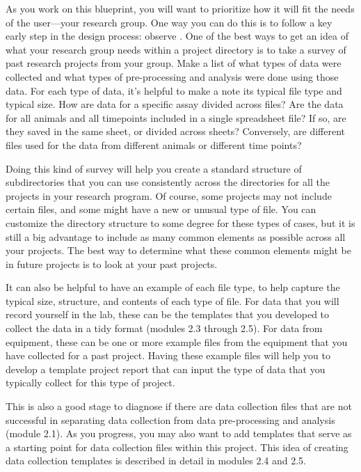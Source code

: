 \documentclass[]{tufte-book}
\begin{document}
As you work on this blueprint, you will want to prioritize how it will fit the
needs of the user---your research group. One way you can do this is to follow a
key early step in the design process: observe \citep{osann2020design}. One of the
best ways to get an idea of what your research group needs within a project
directory is to take a survey of past research projects from your group. Make a
list of what types of data were collected and what types of pre-processing and
analysis were done using those data. For each type of data, it's helpful to make
a note its typical file type and typical size. How are data for a specific assay
divided across files? Are the data for all animals and all timepoints included
in a single spreadsheet file? If so, are they saved in the same sheet, or
divided across sheets? Conversely, are different files used for the data from
different animals or different time points?

Doing this kind of survey will help you create a standard structure of
subdirectories that you can use consistently across the directories for all the
projects in your research program. Of course, some projects may not include
certain files, and some might have a new or unusual type of file. You can
customize the directory structure to some degree for these types of cases, but
it is still a big advantage to include as many common elements as possible
across all your projects. The best way to determine what these common elements
might be in future projects is to look at your past projects.

It can also be helpful to have an example of each file type, to help capture
the typical size, structure, and contents of each type of file. For
data that you will record yourself in the lab, these can be the templates that you
developed to collect the data in a tidy format (modules 2.3 through 2.5).
For data from equipment, these can be one or more example files from the
equipment that you have collected for a past project. Having these example files
will help you to develop a template project report that can input the type of
data that you typically collect for this type of project.

This is also a good stage to diagnose if there are data collection files that
are not successful in separating data collection from data pre-processing and
analysis (module 2.1). As you progress, you may also want to add templates that
serve as a starting point for data collection files within this project. This
idea of creating data collection templates is described in detail in modules 2.4
and 2.5.
\end{document}
